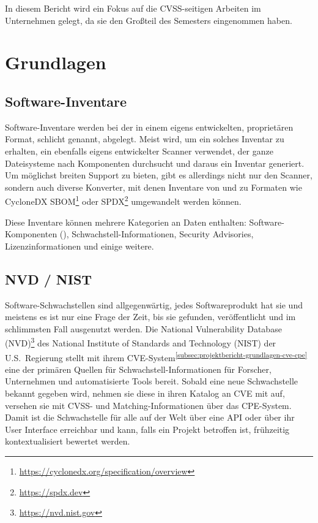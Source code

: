 In diesem Bericht wird ein Fokus auf die CVSS-seitigen Arbeiten im Unternehmen gelegt, da sie den Großteil des Semesters eingenommen haben.




\section{Grundlagen} \label{sec:projektbericht-grundlagen}

\subsection{Software-Inventare} \label{subsec:projektbericht-grundlagen-inventories}

Software-Inventare werden bei der {\metaeffekt} in einem eigens entwickelten, proprietären Format, schlicht  genannt, abgelegt.
Meist wird, um ein solches Inventar zu erhalten, ein ebenfalls eigens entwickelter Scanner verwendet, der ganze Dateisysteme nach Komponenten durchsucht und daraus ein Inventar generiert.
Um möglichst breiten Support zu bieten, gibt es allerdings nicht nur den Scanner, sondern auch diverse Konverter, mit denen Inventare von und zu Formaten wie CycloneDX SBOM\footnote{\url{https://cyclonedx.org/specification/overview}} oder SPDX\footnote{\url{https://spdx.dev}} umgewandelt werden können.

Diese Inventare können mehrere Kategorien an Daten enthalten: Software-Komponenten (), Schwachstell-Informationen, Security Advisories, Lizenzinformationen und einige weitere.

\subsection{NVD / NIST} \label{subsec:projektbericht-grundlagen-nvd-nist}

Software-Schwachstellen sind allgegenwärtig, jedes Softwareprodukt hat sie und meistens es ist nur eine Frage der Zeit, bis sie gefunden, veröffentlicht und im schlimmsten Fall ausgenutzt werden.
Die National Vulnerability Database (NVD)\footnote{\url{https://nvd.nist.gov}} des National Institute of Standards and Technology (NIST) der U.S.\ Regierung stellt mit ihrem CVE-System\textsuperscript{\ref{subsec:projektbericht-grundlagen-cve-cpe}} eine der primären Quellen für Schwachstell-Informationen für Forscher, Unternehmen und automatisierte Tools bereit.
Sobald eine neue Schwachstelle bekannt gegeben wird, nehmen sie diese in ihren Katalog an CVE mit auf, versehen sie mit CVSS- und Matching-Informationen über das CPE-System.
Damit ist die Schwachstelle für alle auf der Welt über eine API oder über ihr User Interface erreichbar und kann, falls ein Projekt betroffen ist, frühzeitig kontextualisiert bewertet werden.


